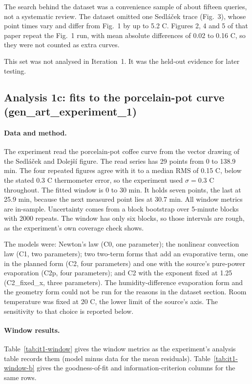 \documentclass[11pt,letterpaper]{article}
\begin{document}
The search behind the dataset was a convenience sample of about fifteen queries, not a systematic review. The dataset omitted one Sedl\'{a}\v{c}ek trace (Fig.~3), whose point times vary and differ from Fig.~1 by up to 5.2 C. Figures 2, 4 and 5 of that paper repeat the Fig.~1 run, with mean absolute differences of 0.02 to 0.16 C, so they were not counted as extra curves.

This set was not analysed in Iteration~1. It was the held-out evidence for later testing.

\subsection{Analysis 1c: fits to the porcelain-pot curve (gen\_art\_experiment\_1)}

\paragraph{Data and method.} The experiment read the porcelain-pot coffee curve from the vector drawing of the Sedl\'{a}\v{c}ek and Dolej\v{s}\'{i} figure. The read series has 29 points from 0 to 138.9 min. The four repeated figures agree with it to a median RMS of 0.15 C, below the stated 0.3 C thermometer error, so the experiment used $\sigma = 0.3$ C throughout. The fitted window is 0 to 30 min. It holds seven points, the last at 25.9 min, because the next measured point lies at 30.7 min. All window metrics are in-sample. Uncertainty comes from a block bootstrap over 5-minute blocks with 2000 repeats. The window has only six blocks, so those intervals are rough, as the experiment's own coverage check shows.

The models were: Newton's law (C0, one parameter); the nonlinear convection law (C1, two parameters); two two-term forms that add an evaporative term, one in the planned form (C2, four parameters) and one with the source's pure-power evaporation (C2p, four parameters); and C2 with the exponent fixed at 1.25 (C2\_fixed\_x, three parameters). The humidity-difference evaporation form and the geometry form could not be run for the reasons in the dataset section. Room temperature was fixed at 20 C, the lower limit of the source's axis. The sensitivity to that choice is reported below.

\paragraph{Window results.} Table~\ref{tab:it1-window} gives the window metrics as the experiment's analysis table records them (model minus data for the mean residuals). Table~\ref{tab:it1-window-b} gives the goodness-of-fit and information-criterion columns for the same rows.
\end{document}
